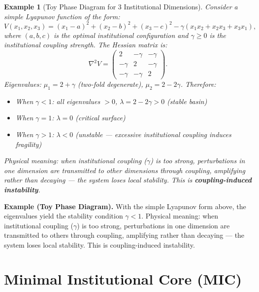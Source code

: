 \documentclass[12pt,a4paper]{article}
\newtheorem{example}[theorem]{Example}
\theoremstyle{definition}
\newcommand{\lb}{\lambda}
\newcommand{\Lyap}{V}
\begin{document}
\begin{example}[Toy Phase Diagram for 3 Institutional Dimensions]
\label{ex:toy_phase}
Consider a simple Lyapunov function of the form:
\begin{equation}\label{eq:toy_lyap}
    \Lyap(x_1, x_2, x_3) = (x_1 - a)^2 + (x_2 - b)^2 + (x_3 - c)^2 - \gamma(x_1 x_2 + x_2 x_3 + x_3 x_1),
\end{equation}
where $(a, b, c)$ is the optimal institutional configuration and $\gamma \geq 0$ is the institutional coupling strength. The Hessian matrix is:
\begin{equation}\label{eq:toy_hessian}
    \nabla^2 \Lyap = \begin{pmatrix}
        2 & -\gamma & -\gamma \\
        -\gamma & 2 & -\gamma \\
        -\gamma & -\gamma & 2
    \end{pmatrix}.
\end{equation}
Eigenvalues: $\mu_1 = 2 + \gamma$ (two-fold degenerate), $\mu_2 = 2 - 2\gamma$. Therefore:
\begin{itemize}
    \item When $\gamma < 1$: all eigenvalues $>0$, $\lb = 2-2\gamma > 0$ (stable basin)
    \item When $\gamma = 1$: $\lb = 0$ (critical surface)
    \item When $\gamma > 1$: $\lb < 0$ (unstable --- excessive institutional coupling induces fragility)
\end{itemize}
Physical meaning: when institutional coupling ($\gamma$) is too strong, perturbations in one dimension are transmitted to other dimensions through coupling, amplifying rather than decaying --- the system loses local stability. This is \textbf{coupling-induced instability}.
\end{example}

\noindent
\textbf{Example (Toy Phase Diagram).}
With the simple Lyapunov form above, the eigenvalues yield the stability condition $\gamma < 1$. Physical meaning: when institutional coupling ($\gamma$) is too strong, perturbations in one dimension are transmitted to others through coupling, amplifying rather than decaying --- the system loses local stability. This is coupling-induced instability.

\section{Minimal Institutional Core (MIC)}
\label{sec:mic}
\end{document}
